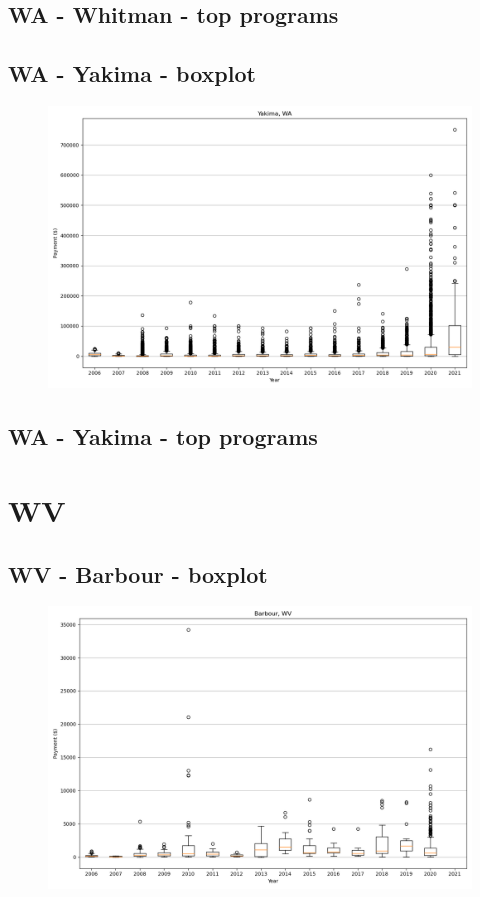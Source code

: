 \subsection*{WA - Whitman - top programs}

\newpage
\subsection*{WA - Yakima - boxplot}
\begin{figure}[h]
\centering
\includegraphics[width=7in]{../output/boxplots/counties/Yakima-WA_boxplot.png}
\end{figure}


\subsection*{WA - Yakima - top programs}

\newpage
\section*{WV}
\subsection*{WV - Barbour - boxplot}
\begin{figure}[h]
\centering
\includegraphics[width=7in]{../output/boxplots/counties/Barbour-WV_boxplot.png}
\end{figure}


